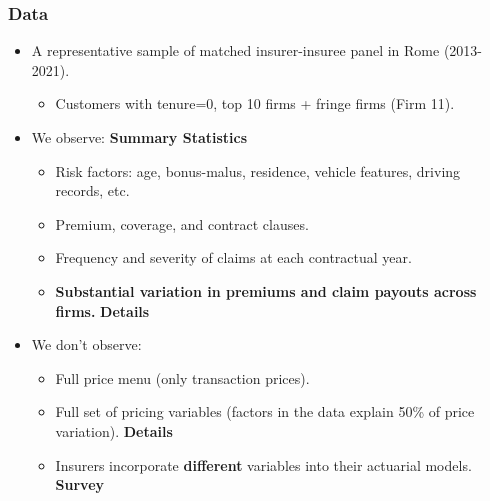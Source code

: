 \documentclass[10pt,aspectratio=169]{beamer}
\begin{document}
\begin{frame}
\frametitle{Data}
    \begin{itemize}
        \item A representative sample of matched insurer-insuree panel in Rome (2013-2021).
        \begin{itemize}
            \item Customers with tenure=0, top 10 firms + fringe firms (Firm 11).
        \end{itemize}
        
        \medskip
        \item We observe: \textbf{Summary Statistics}
        \begin{itemize}
            \item Risk factors: age, bonus-malus, residence, vehicle features, driving records, etc.
            \item Premium, coverage, and contract clauses.
            \item Frequency and severity of claims at each contractual year.
            \item \textbf{Substantial variation in premiums and claim payouts across firms.} \textbf{Details}
        \end{itemize}
        
        \medskip
        \item We don't observe:
        \begin{itemize}
            \item Full price menu (only transaction prices).
            \item Full set of pricing variables (factors in the data explain 50\% of price variation). \textbf{Details}
            \item Insurers incorporate \textbf{different} variables into their actuarial models. \textbf{Survey}
        \end{itemize}
    \end{itemize}
\end{frame}
\end{document}

